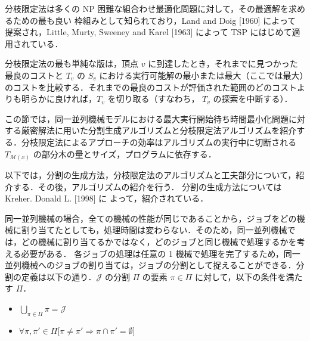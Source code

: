 \documentclass[12pt]{optlab-bachelor}
\begin{document}
分枝限定法は多くの NP 困難な組合わせ最適化問題に対して，その最適解を求めるための最も良い
枠組みとして知られており，Land and Doig [1960] \cite{BandB} によって
提案され，Little, Murty, Sweeney and Karel [1963] \cite{BandB2}
によって TSP にはじめて適用されている．

分枝限定法の最も単純な版は，頂点 $v$ に到達したとき，それまでに見つかった最良のコストと $T_v$
の $S_v$ における実行可能解の最小または最大（ここでは最大）のコストを比較する．それまでの最良のコストが評価された範囲のどのコストよりも明らかに良ければ，$T_v$ を切り取る（すなわち， $T_v$ の探索を中断する）．


この節では，同一並列機械モデルにおける最大実行開始待ち時間最小化問題に対する厳密解法に用いた分割生成アルゴリズムと分枝限定法アルゴリズムを紹介する．分枝限定法によるアプローチの効率はアルゴリズムの実行中に切断される $T_{\mathcal{M}(x)}$ の部分木の量とサイズ，プログラムに依存する．%

以下では，分割の生成方法，分枝限定法のアルゴリズムと工夫部分について，紹介する．その後，アルゴリズムの紹介を行う．
分割の生成方法については Kreher. Donald L. [1998] \cite{rgf} に
よって，紹介されている．

同一並列機械の場合，全ての機械の性能が同じであることから，ジョブをどの機械に割り当てたとしても，処理時間は変わらない．そのため，同一並列機械では，どの機械に割り当てるかではなく，どのジョブと同じ機械で処理するかを考える必要がある．
各ジョブの処理は任意の 1 機械で処理を完了するため，同一並列機械へのジョブの割り当ては，ジョブの分割として捉えることができる．分割の定義は以下の通り．$\mathcal{J}$ の分割 $\Pi$ の要素 $\pi \in \Pi$ に対して，以下の条件を満たす $\Pi$．
\begin{itemize}
  \item $\displaystyle \bigcup_{\pi \in \Pi}\pi = \mathcal{J} $
  \item $\forall \pi, \pi' \in \Pi \big[\pi \neq \pi' \Rightarrow \pi \cap \pi' = \emptyset \big]$
\end{itemize}
\end{document}
